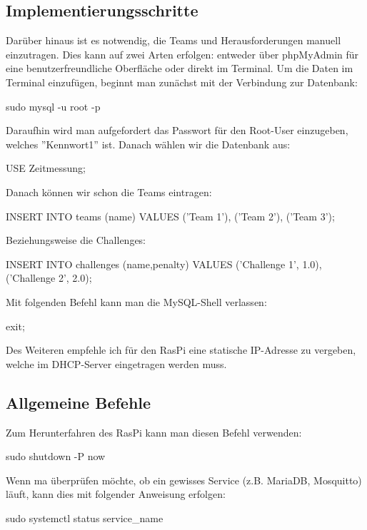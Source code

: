 \subsection{Implementierungsschritte}
Darüber hinaus ist es notwendig, die Teams und Herausforderungen manuell einzutragen. Dies kann auf zwei Arten erfolgen: entweder über phpMyAdmin für eine benutzerfreundliche Oberfläche oder direkt im Terminal. Um die Daten im Terminal einzufügen, beginnt man zunächst mit der Verbindung zur Datenbank:

\begin{Textfeld1}
	sudo mysql -u root -p
\end{Textfeld1}
Daraufhin wird man aufgefordert das Passwort für den Root-User einzugeben, welches ''Kennwort1'' ist. Danach wählen wir die Datenbank aus:

\begin{Textfeld2}
	USE Zeitmessung;
\end{Textfeld2}

Danach können wir schon die Teams eintragen:

\begin{Textfeld2}
	INSERT INTO teams (name) VALUES ('Team 1'), ('Team 2'), ('Team 3');
\end{Textfeld2}

Beziehungsweise die Challenges:
\begin{Textfeld2}
	INSERT INTO challenges (name,penalty) VALUES ('Challenge 1', 1.0), ('Challenge 2', 2.0);
\end{Textfeld2}

Mit folgenden Befehl kann man die MySQL-Shell verlassen:
\begin{Textfeld2}
	exit;
\end{Textfeld2}

Des Weiteren empfehle ich für den \ac{RasPi} eine statische IP-Adresse zu vergeben, welche im \ac{DHCP}-Server eingetragen werden muss.

\subsection{Allgemeine Befehle}
Zum Herunterfahren des \ac{RasPi} kann man diesen Befehl verwenden:
\begin{Textfeld1}
	sudo shutdown -P now
\end{Textfeld1}

Wenn ma überprüfen möchte, ob ein gewisses Service (z.B. MariaDB, Mosquitto) läuft, kann dies mit folgender Anweisung erfolgen:
\begin{Textfeld1}
	sudo systemctl status service\_name
\end{Textfeld1}

